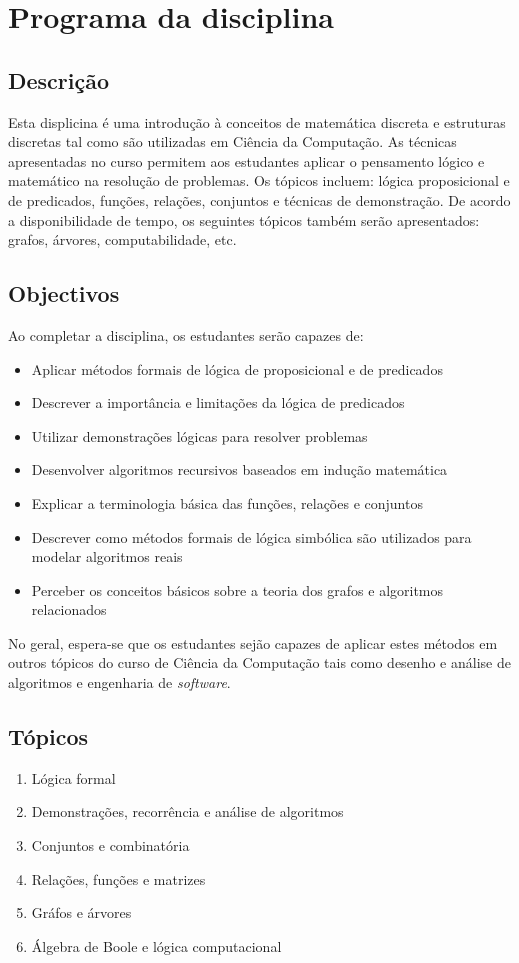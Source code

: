 \chapter*{Programa da disciplina}

\section*{Descrição}

Esta displicina é uma introdução à conceitos de matemática discreta e estruturas discretas tal como são utilizadas em Ciência
da Computação. As técnicas apresentadas no curso permitem aos estudantes aplicar o pensamento lógico e matemático
na resolução de problemas. Os tópicos incluem: lógica proposicional e de predicados, funções, relações, conjuntos 
e técnicas de demonstração. De acordo a disponibilidade de tempo, os seguintes tópicos também serão apresentados: grafos, árvores, computabilidade, etc.

\section*{Objectivos}


Ao completar a disciplina, os estudantes serão capazes de:
\begin{itemize}
  \item Aplicar métodos formais de lógica de proposicional e de predicados
  \item Descrever a importância e limitações da lógica de predicados
  \item Utilizar demonstrações lógicas para resolver problemas
  \item Desenvolver algoritmos recursivos baseados em indução matemática
  \item Explicar a terminologia básica das funções, relações e conjuntos
  \item Descrever como métodos formais de lógica simbólica são utilizados para modelar algoritmos reais
  \item Perceber os conceitos básicos sobre a teoria dos grafos e algoritmos relacionados\
\end{itemize} 

No geral, espera-se que os estudantes sejão capazes de aplicar estes métodos em outros tópicos do curso de Ciência da Computação
tais como desenho e análise de algoritmos e engenharia de \emph{software}.


\section*{Tópicos}
\begin{enumerate}
  \item Lógica formal
  \item Demonstrações, recorrência e análise de algoritmos
  \item Conjuntos e combinatória
  \item Relações, funções e matrizes
  \item Gráfos e árvores
  \item Álgebra de Boole e lógica computacional
\end{enumerate}

